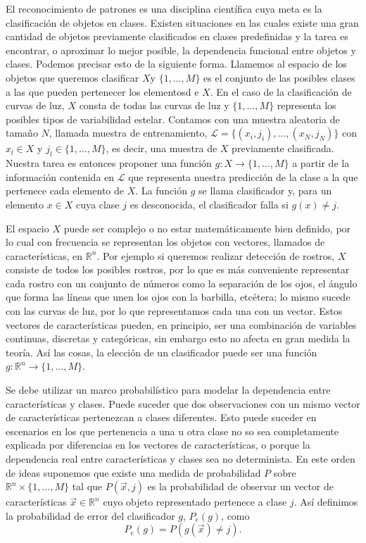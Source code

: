 \documentclass[letterpaper,12pt]{book}
\begin{document}
El reconocimiento de patrones es una disciplina científica cuya meta es la clasificación de objetos en clases. Existen situaciones en las cuales existe una gran cantidad de objetos previamente clasificados en clases predefinidas y la tarea es encontrar, o aproximar lo mejor posible, la dependencia funcional entre objetos y clases. Podemos precisar esto de la siguiente forma. Llamemos al espacio de los objetos que queremos clasificar $X$y $\{1,\dots, M\}$ es el conjunto de las posibles clases a las que pueden pertenecer los elementosd e $X$.  En el caso de la clasificación de curvas de luz, $X$ consta de todas las curvas de luz y  $\{1,\dots, M\}$ representa los posibles tipos de variabilidad estelar. Contamos con una muestra aleatoria de tamaño $N$, llamada muestra de entrenamiento, $\mathcal{L} = \{(x_i,j_i), \dots, (x_N,j_N)\}$  con $x_l\in X$ y $j_l\in \{1, \dots, M\}$, es decir, una muestra de $X$ previamente clasificada. Nuestra tarea es entonces proponer una función $g:X\rightarrow \{1,\dots, M\}$ a partir de la información contenida en $\mathcal{L}$ que representa nuestra predicción de la clase a la que pertenece cada elemento de $X$. La función $g$ se llama clasificador y, para un elemento $x\in X$ cuya clase $j$ es desconocida, el clasificador falla si $g(x)\neq j$.

El espacio $X$ puede ser complejo o no estar matemáticamente bien definido, por lo cual con frecuencia se representan los objetos con vectores, llamados de características,  en $\mathbb{R}^n$. Por ejemplo si queremos realizar detección de rostros, $X$ consiste de todos los posibles rostros, por lo que es más conveniente representar cada rostro con un conjunto de números como la separación de los ojos, el ángulo que forma las líneas que unen los ojos con la barbilla, etcétera; lo mismo sucede con las curvas de luz, por lo que representamos cada una con un vector. Estos vectores de características pueden, en principio, ser una combinación de variables continuas, discretas y categóricas, sin embargo esto no afecta en gran medida la teoría. Así las cosas, la elección de un clasificador puede ser una función $g:\mathbb{R}^n\rightarrow \{1, \dots, M\}$.

Se debe utilizar un marco probabilístico para modelar la dependencia entre características y clases. Puede suceder que dos observaciones con un mismo vector de características pertenezcan a clases diferentes. Esto puede suceder en escenarios en los que pertenencia a una u otra clase no so sea completamente explicada por diferencias en los vectores de características, o porque la dependencia real entre características y clases sea no determinista. En este orden de ideas suponemos que existe una medida de probabilidad $P$ sobre $\mathbb{R}^n\times \{1, \dots, M\}$ tal que $P(\vec{x}, j)$ es la probabilidad de observar un vector de características $\vec{x}\in\mathbb{R}^n$ cuyo objeto representado pertenece a clase $j$. Así definimos la probabilidad de error del clasificador $g$, $P_{e}(g)$, como 
\begin{equation}
P_e(g) = P(g(\vec{x})\neq j).
\end{equation}
\end{document}
